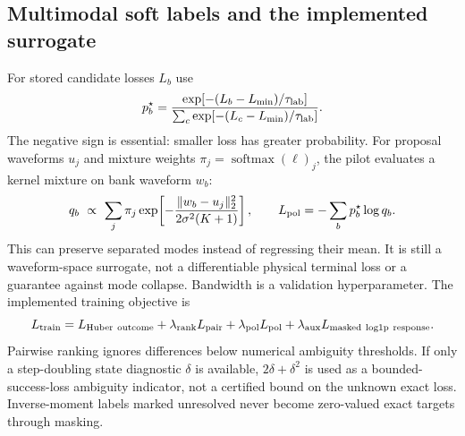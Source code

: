 \documentclass[10pt]{article}
\newcommand{\softmax}{\operatorname{softmax}}
\begin{document}
\subsection{Multimodal soft labels and the implemented surrogate}
For stored candidate losses $L_b$ use
\begin{equation}
 p_b^\star=\frac{\exp[-(L_b-L_{\min})/\tau_{\rm lab}]}
                     {\sum_c\exp[-(L_c-L_{\min})/\tau_{\rm lab}]}.
\end{equation}
The negative sign is essential: smaller loss has greater probability.
For proposal waveforms $u_j$ and mixture weights
$\pi_j=\softmax(\ell)_j$, the pilot evaluates a kernel mixture on bank waveform
$w_b$:
\begin{equation}
 q_b\ \propto\ \sum_j\pi_j
       \exp\!\left[-\frac{\|w_b-u_j\|_2^2}{2\sigma^2(K+1)}\right],
 \qquad L_{\rm pol}=-\sum_bp_b^\star\log q_b.
\end{equation}
This can preserve separated modes instead of regressing their mean. It is still
a waveform-space surrogate, not a differentiable physical terminal loss or a
guarantee against mode collapse. Bandwidth is a validation hyperparameter.
The implemented training objective is
\begin{equation}
 L_{\rm train}=L_{\rm Huber\ outcome}
       +\lambda_{\rm rank}L_{\rm pair}
       +\lambda_{\rm pol}L_{\rm pol}
       +\lambda_{\rm aux}L_{\rm masked\ log1p\ response}.
\end{equation}
Pairwise ranking ignores differences below numerical ambiguity thresholds.
If only a step-doubling state diagnostic $\delta$ is available, $2\delta+\delta^2$
is used as a bounded-success-loss ambiguity indicator, not a certified bound
on the unknown exact loss. Inverse-moment labels marked unresolved never
become zero-valued exact targets through masking.
\end{document}
